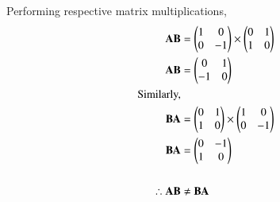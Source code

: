 Performing respective matrix multiplications,
\begin{align}
    \mathbf{AB} &= \begin{pmatrix}1 & 0\\ 0 & -1\end{pmatrix}\times\begin{pmatrix}0 & 1\\1 & 0\end{pmatrix}\\
    \mathbf{AB} &= \begin{pmatrix}0 & 1\\-1 & 0\end{pmatrix}\\
    \text{Similarly,}\notag \\
    \mathbf{BA} &= \begin{pmatrix}0 & 1\\1 & 0\end{pmatrix}\times\begin{pmatrix}1 & 0\\ 0 & -1\end{pmatrix}\\
    \mathbf{BA} &= \begin{pmatrix}0 & -1\\1 & 0\end{pmatrix}\\
    \\\therefore \mathbf{AB} &\neq \mathbf{BA}
\end{align}